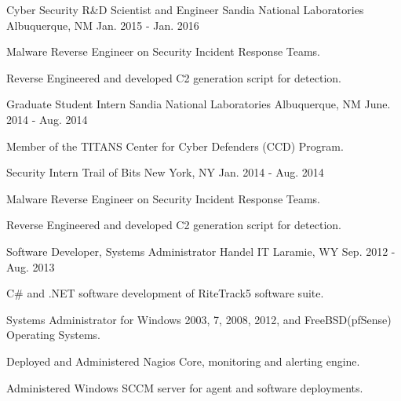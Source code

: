 \begin{cventries}

\cventry
{Cyber Security R\&D Scientist and Engineer} %
{Sandia National Laboratories} %
{Albuquerque, NM} %
{Jan. 2015 - Jan. 2016} %
{ %
\begin{cvitems}
\item {Malware Reverse Engineer on Security Incident Response Teams.}
\item {Reverse Engineered and developed C2 generation script for detection.}
\end{cvitems}
}


\cventry
{Graduate Student Intern} %
{Sandia National Laboratories} %
{Albuquerque, NM} %
{June. 2014 - Aug. 2014} %
{ %
\begin{cvitems}
\item {Member of the TITANS Center for Cyber Defenders (CCD) Program.}
\end{cvitems}
}


\cventry
{Security Intern} %
{Trail of Bits} %
{New York, NY} %
{Jan. 2014 - Aug. 2014} %
{ %
\begin{cvitems}
\item {Malware Reverse Engineer on Security Incident Response Teams.}
\item {Reverse Engineered and developed C2 generation script for detection.}
\end{cvitems}
}


\cventry
{Software Developer, Systems Administrator} %
{Handel IT} %
{Laramie, WY} %
{Sep. 2012 - Aug. 2013} %
{ %
\begin{cvitems}
\item {C# and .NET software development of RiteTrack5 software suite.}
\item {Systems Administrator for Windows 2003, 7, 2008, 2012, and FreeBSD(pfSense) Operating Systems.}
\item {Deployed and Administered Nagios Core, monitoring and alerting engine.}
\item {Administered Windows SCCM server for agent and software deployments.}
\end{cvitems} 
}


\end{cventries}
